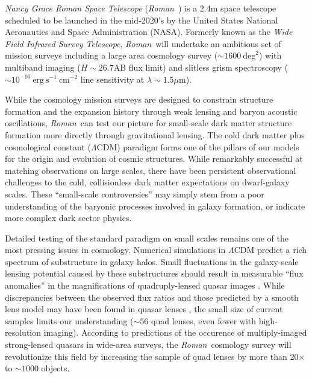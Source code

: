 \documentclass[11pt]{article}
\newcommand{\RST}{\emph{Roman}~}
\begin{document}
\clearpage

\noindent %

\emph{Nancy Grace Roman Space Telescope} (\RST) is a 2.4m space telescope scheduled 
to be launched in the
mid-2020's by the United States National Aeronautics and Space Administration (NASA)\citep{spergel2015a,akeson2019a}.
Formerly known as the \emph{Wide Field Infrared Survey Telescope}, \RST will undertake
an ambitious set of mission surveys including a large area cosmology survey ($\sim 1600~\mathrm{deg}^2$)
with multiband imaging ($H\sim26.7$AB flux limit) and slitless grism spectroscopy ($\sim10^{-16}~\mathrm{erg}~\mathrm{s}^{-1}~\mathrm{cm}^{-2}$ line sensitivity at $\lambda\sim1.5\mu$m).

While the cosmology mission surveys are designed to constrain structure formation and the
expansion history through weak lensing and baryon acoustic oscillations, 
\RST can test our picture for small-scale dark matter structure formation more
directly through gravitational lensing. The cold dark matter plus cosmological constant ($\Lambda$CDM)
paradigm forms one of the pillars of our models for the origin and evolution of cosmic structures.
While remarkably successful at matching observations on large scales, there have been persistent
observational challenges to the cold, collisionless dark matter expectations on dwarf-galaxy
scales. These “small-scale controversies” may simply stem from a poor understanding of the
baryonic processes involved in galaxy formation, or indicate more complex dark sector physics\citep{bullock2017a}.

Detailed testing of the standard paradigm on small scales remains one of the most pressing issues
in cosmology. Numerical simulations in $\Lambda$CDM predict a rich spectrum of substructure in galaxy
halos. Small fluctuations in the galaxy-scale lensing potential caused by these substructures
should result in measurable “flux anomalies” in the magnifications of quadruply-lensed quasar
images \citep{metcalf2001a}. While discrepancies between the observed flux ratios and
those predicted by a smooth lens model may have been found in quasar lenses \citep{mao1998a,dalal2002a,metcalf2002a}, the small size of current samples limits our understanding ($\sim56$
quad lenses\citep{lemon2020a}, even fewer with high-resolution imaging). According to predictions of the
occurence of multiply-imaged strong-lensed quasars in wide-area surveys\citep{oguri2010a},
the \RST cosmology
survey will revolutionize this field
by increasing the sample of quad lenses by more than 20$\times$ to $\sim1000$ objects.
\end{document}
